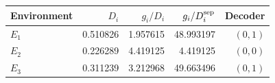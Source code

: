 \begin{tabular}{lrrrr}
\toprule
Environment & $D_i$ & $g_i/D_i$ & $g_i/D_i^{\rm sep}$ & Decoder\\
\midrule
$E_1$ & 0.510826 & 1.957615 & 48.993197 & $(0,1)$\\
$E_2$ & 0.226289 & 4.419125 & 4.419125 & $(0,0)$\\
$E_3$ & 0.311239 & 3.212968 & 49.663496 & $(0,1)$\\
\bottomrule
\end{tabular}
